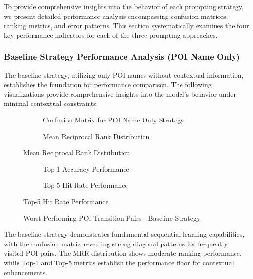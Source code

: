 To provide comprehensive insights into the behavior of each prompting strategy, we present detailed performance analysis encompassing confusion matrices, ranking metrics, and error patterns. This section systematically examines the four key performance indicators for each of the three prompting approaches.

\subsubsection{Baseline Strategy Performance Analysis (POI Name Only)}

The baseline strategy, utilizing only POI names without contextual information, establishes the foundation for performance comparison. The following visualizations provide comprehensive insights into the model's behavior under minimal contextual constraints.

\begin{figure}[h]
\centering
\begin{subfigure}{0.48\textwidth}
\centering
\caption{Confusion Matrix for POI Name Only Strategy}
\label{fig:baseline_confusion}
\end{subfigure}
\hfill
\begin{subfigure}{0.48\textwidth}
\centering
\caption{Mean Reciprocal Rank Distribution}
\label{fig:baseline_mrr}
\end{subfigure}
\end{figure}

\begin{figure}[h]
\centering
\begin{subfigure}{0.48\textwidth}
\centering
\caption{Top-1 Accuracy Performance}
\label{fig:baseline_top1}
\end{subfigure}
\hfill
\begin{subfigure}{0.48\textwidth}
\centering
\caption{Top-5 Hit Rate Performance}
\label{fig:baseline_top5}
\end{subfigure}
\end{figure}

\begin{figure}[h]
\centering
\caption{Worst Performing POI Transition Pairs - Baseline Strategy}
\label{fig:baseline_worst_pairs}
\end{figure}

The baseline strategy demonstrates fundamental sequential learning capabilities, with the confusion matrix revealing strong diagonal patterns for frequently visited POI pairs. The MRR distribution shows moderate ranking performance, while Top-1 and Top-5 metrics establish the performance floor for contextual enhancements.

